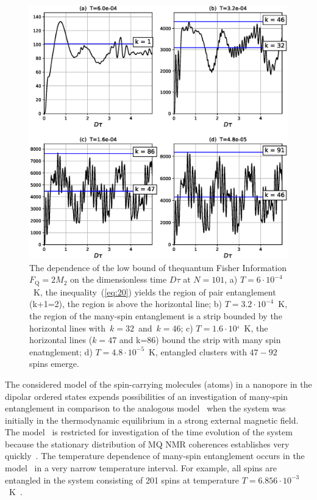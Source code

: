 \documentclass[review]{elsarticle}
\begin{document}
\begin{figure}
  	\includegraphics[width=0.95\linewidth]{fisher_low_bound_n101.eps}
	\caption{
	    The dependence of the low bound of thequantum Fisher Information $F_\mathrm{Q} = 2 M_{2}$ 
	    on the dimensionless time $D\tau$ at $N=101$, 
	    a) $T=6\cdot10^{-4}$~K, the inequality~(\ref{eq:20}) yields the region of pair entanglement (k+1=2), the region is above the horizontal line; 
	    b) $T=3.2\cdot10^{-4}$~K, the region of the many-spin entanglement is a strip bounded by the horizontal lines with~$k=32$~and~$k=46$; 
	    c) $T = 1.6\cdot10^{_4}$~K, the horizontal lines ($k=47$ and k=$86$) bound the strip with many spin enatnglement;
	    d) $T=4.8\cdot10^{-5}$~K, entangled clusters with $47-92$ spins emerge.
	}
	\label{fig:2}
\end{figure}

The considered model of the spin-carrying molecules (atoms) in a nanopore in the dipolar ordered states expends possibilities of an investigation of many-spin entanglement in comparison to the analogous model~\cite{Doronin_2019}
when the system was initially in the thermodynamic equilibrium in a strong external magnetic field.
The model~\cite{Doronin_2019}  is restricted for investigation of the time evolution of the system
because the stationary distribution of MQ NMR coherences establishes very quickly~\cite{Doronin_2009}.
The temperature dependence of many-spin entanglement occurs in the model~\cite{Doronin_2019} in a very narrow temperature interval.
For example, all spins are entangled in the system consisting of 201 spins at temperature $T=6.856\cdot10^{-3}$~K~\cite{Doronin_2019}.
\end{document}

